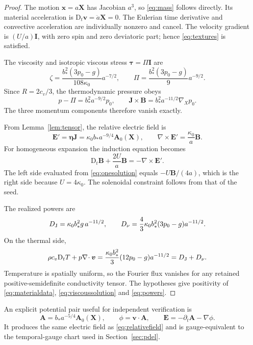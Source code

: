 \documentclass[11pt,a4paper]{article}
\theoremstyle{remark}\newtheorem{remark}{Remark}
\numberwithin{equation}{section}
\newcommand{\vv}{\boldsymbol v}
\newcommand{\BB}{\boldsymbol B}
\newcommand{\JJ}{\boldsymbol J}
\newcommand{\Avec}{\boldsymbol A}
\newcommand{\EE}{\boldsymbol E}
\newcommand{\xx}{\boldsymbol x}
\newcommand{\XX}{\boldsymbol X}
\newcommand{\ttau}{\boldsymbol\tau}
\newcommand{\etab}{\boldsymbol\eta}
\newcommand{\Id}{\boldsymbol I}
\newcommand{\grad}{\nabla}
\newcommand{\diver}{\nabla\!\cdot}
\newcommand{\curl}{\nabla\!\times}
\newcommand{\Dt}{\mathrm D_t}
\begin{document}
\begin{proof}
The motion $\xx=a\XX$ has Jacobian $a^3$, so \eqref{eq:mass} follows directly. Its material acceleration is $\Dt\vv=\ddot a\XX=0$. The Eulerian time derivative and convective acceleration are individually nonzero and cancel. The velocity gradient is $(U/a)\Id$, with zero spin and zero deviatoric part; hence \eqref{eq:textures} is satisfied.

The viscosity and isotropic viscous stress $\ttau=\Pi\Id$ are
\begin{equation}
\zeta=\frac{b_*^2(3p_0-g)}{108\kappa_0}a^{-7/2},\qquad
\Pi=\frac{b_*^2(3p_0-g)}9a^{-9/2}.
\label{eq:viscoussolution}
\end{equation}
Since $R=2c_v/3$, the thermodynamic pressure obeys
\begin{equation}
p-\Pi=b_*^2a^{-9/2}p_0,\qquad
\JJ\times\BB=b_*^2a^{-11/2}\grad_Xp_0.
\label{eq:forcebalance}
\end{equation}
The three momentum components therefore vanish exactly.

From Lemma~\ref{lem:tensor}, the relative electric field is
\begin{equation}
\EE'=\etab\JJ=\kappa_0b_*a^{-9/4}\Avec_0(\XX),
\qquad
\curl\EE'=\frac{\kappa_0}{a}\BB.
\label{eq:relativefield}
\end{equation}
For homogeneous expansion the induction equation becomes
\[
\Dt\BB+\frac{2U}{a}\BB=-\curl\EE'.
\]
The left side evaluated from \eqref{eq:onesolution} equals $-U\BB/(4a)$, which is the right side because $U=4\kappa_0$. The solenoidal constraint follows from that of the seed.

The realized powers are
\begin{equation}
D_{\rm J}=\kappa_0b_*^2g\,a^{-11/2},\qquad
D_\nu=\frac43\kappa_0b_*^2(3p_0-g)a^{-11/2}.
\label{eq:powers}
\end{equation}
On the thermal side,
\begin{equation}
\rho c_v\Dt T+p\diver\vv
=\frac{\kappa_0b_*^2}{3}(12p_0-g)a^{-11/2}
=D_{\rm J}+D_\nu.
\label{eq:thermalclosure}
\end{equation}
Temperature is spatially uniform, so the Fourier flux vanishes for any retained positive-semidefinite conductivity tensor. The hypotheses give positivity of \eqref{eq:materialdata}, \eqref{eq:viscoussolution} and \eqref{eq:powers}.
\end{proof}

An explicit potential pair useful for independent verification is
\begin{equation}
\Avec=b_*a^{-5/4}\Avec_0(\XX),\qquad
\phi=\vv\cdot\Avec,\qquad
\EE=-\partial_t\Avec-\grad\phi.
\label{eq:potentialpair}
\end{equation}
It produces the same electric field as \eqref{eq:relativefield} and is gauge-equivalent to the temporal-gauge chart used in Section~\ref{sec:pdel}.
\end{document}
